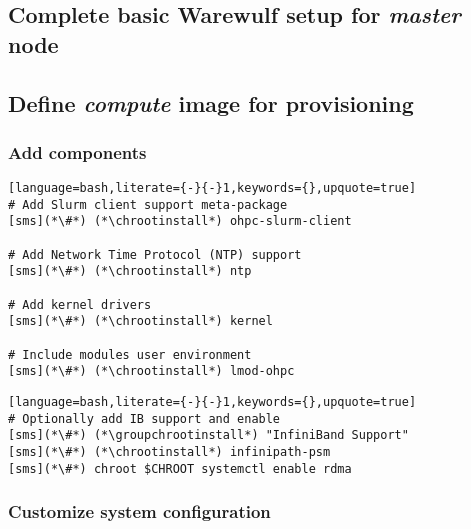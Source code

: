 \documentclass[letterpaper]{article}
\newcommand{\chrootinstall}{yum -y --installroot=\$CHROOT install}
\newcommand{\groupchrootinstall}{yum -y --installroot=\$CHROOT groupinstall}
\begin{document}
\vspace*{-0.15cm}
\subsection{Complete basic Warewulf setup for {\em master} node} \label{sec:setup_ww}




\subsection{Define {\em compute} image for provisioning}


\subsubsection{Add \OHPC{} components} \label{sec:add_components}


\begin{lstlisting}[language=bash,literate={-}{-}1,keywords={},upquote=true]
# Add Slurm client support meta-package
[sms](*\#*) (*\chrootinstall*) ohpc-slurm-client

# Add Network Time Protocol (NTP) support
[sms](*\#*) (*\chrootinstall*) ntp

# Add kernel drivers
[sms](*\#*) (*\chrootinstall*) kernel

# Include modules user environment
[sms](*\#*) (*\chrootinstall*) lmod-ohpc
\end{lstlisting}

\begin{lstlisting}[language=bash,literate={-}{-}1,keywords={},upquote=true]
# Optionally add IB support and enable
[sms](*\#*) (*\groupchrootinstall*) "InfiniBand Support"
[sms](*\#*) (*\chrootinstall*) infinipath-psm
[sms](*\#*) chroot $CHROOT systemctl enable rdma
\end{lstlisting}


\subsubsection{Customize system configuration} \label{sec:master_customization}

\end{document}
